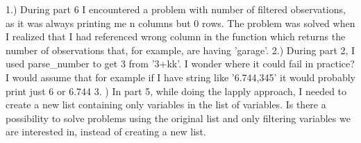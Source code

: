 1.) During part 6 I encountered a problem with number of filtered observations, as it was always printing me n columns but 0 rows. The problem was solved when I realized that I had referenced wrong column in the function which returns the number of observations that, for example, are having 'garage'.
2.) During part 2, I used parse_number to get 3 from '3+kk'. I wonder where it could fail in practice? I would assume that for example if I have string like '6.744,345' it would probably print just 6 or 6.744
3. ) In part 5, while doing the lapply approach, I needed to create a new list containing only variables in the list of variables. Is there a possibility to solve problems using the original list and only filtering variables we are interested in, instead of creating a new list.
